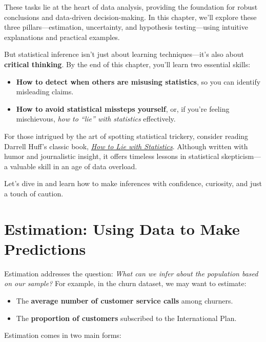 \documentclass[
]{book}
\providecommand{\tightlist}{%
  \setlength{\itemsep}{0pt}\setlength{\parskip}{0pt}}
\theoremstyle{definition}
\theoremstyle{definition}
\theoremstyle{definition}
\theoremstyle{definition}
\theoremstyle{remark}
\begin{document}
These tasks lie at the heart of data analysis, providing the foundation for robust conclusions and data-driven decision-making. In this chapter, we'll explore these three pillars---estimation, uncertainty, and hypothesis testing---using intuitive explanations and practical examples.

But statistical inference isn't just about learning techniques---it's also about \textbf{critical thinking}. By the end of this chapter, you'll learn two essential skills:

\begin{itemize}
\tightlist
\item
  \textbf{How to detect when others are misusing statistics}, so you can identify misleading claims.\\
\item
  \textbf{How to avoid statistical missteps yourself}, or, if you're feeling mischievous, \emph{how to ``lie'' with statistics} effectively.
\end{itemize}

For those intrigued by the art of spotting statistical trickery, consider reading Darrell Huff's classic book, \href{https://www.goodreads.com/book/show/51291.How_to_Lie_with_Statistics}{\emph{How to Lie with Statistics}}. Although written with humor and journalistic insight, it offers timeless lessons in statistical skepticism---a valuable skill in an age of data overload.

Let's dive in and learn how to make inferences with confidence, curiosity, and just a touch of caution.

\section{Estimation: Using Data to Make Predictions}\label{estimation-using-data-to-make-predictions}

Estimation addresses the question: \emph{What can we infer about the population based on our sample?} For example, in the churn dataset, we may want to estimate:

\begin{itemize}
\tightlist
\item
  The \textbf{average number of customer service calls} among churners.
\item
  The \textbf{proportion of customers} subscribed to the International Plan.
\end{itemize}

Estimation comes in two main forms:
\end{document}
